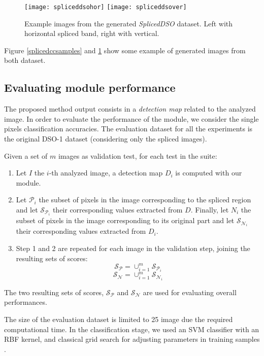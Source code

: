 \begin{figure}[!htb]
  \texttt{[image: spliceddsohor]}
\endminipage\hfill
{}
  \texttt{[image: spliceddsover]}
\endminipage
\caption{Example images from the generated \emph{SplicedDSO} dataset. Left with horizontal spliced band, right with vertical.}\label{fig:spliceddsosamples}
\end{figure}

Figure \ref{splicedccsamples} and \ref{fig:spliceddsosamples} show some example of generated images from both dataset. 

\subsection{Evaluating module performance}

The proposed method output consists in a\emph{ detection map} related to the analyzed image. In order to evaluate the performance of the module, we consider the single pixels classification accuracies. The evaluation dataset for all the experiments is the original DSO-1 dataset (considering only the spliced images).

Given a set of $m$ images as validation test, for each test in the suite:
\begin{enumerate}
\item Let $I$ the $i$-th analyzed image, a detection map $D_i$ is computed with our module.
\item Let $\mathcal{P}_i$ the subset of pixels in the image corresponding to the spliced region and let $\mathcal{S}_{\mathcal{P}_i}$ their corresponding values extracted from $D$. Finally, let $N_i$ the subset of pixels in the image corresponding to its original part and let $\mathcal{S}_{\mathcal{N}_i}$ their corresponding values extracted from $D_i$.
\item Step 1 and 2 are repeated for each image in the validation step, joining the resulting sets of scores:
$$
\mathcal{S}_{\mathcal{P}} = \cup_{i = 1}^{m} \mathcal{S}_{\mathcal{P}_i}
$$
$$
\mathcal{S}_{\mathcal{N}} = \cup_{i = 1}^{m} \mathcal{S}_{\mathcal{N}_i}
$$
\end{enumerate}

The two resulting sets of scores, $\mathcal{S}_{\mathcal{P}}$ and $\mathcal{S}_{\mathcal{N}}$ are used for evaluating overall performances.

The size of the evaluation dataset is limited to 25 image due the  required computational time. In the classification stage, we used an SVM classifier with an RBF kernel, and classical grid search for adjusting parameters in training samples \cite{bishop2007pattern}.

